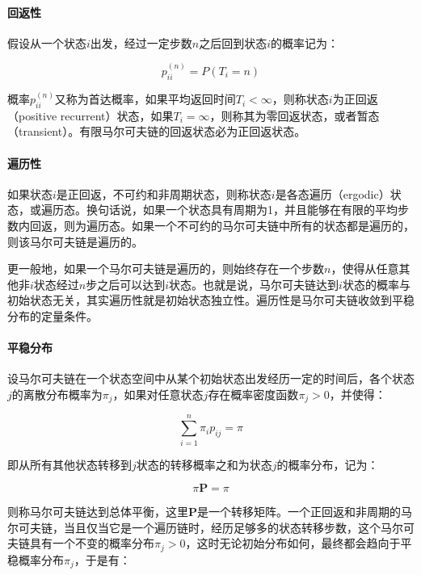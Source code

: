 \paragraph{回返性}
假设从一个状态$i$出发，经过一定步数$n$之后回到状态$i$的概率记为：

\begin{equation}
	p^{(n)}_{ii}=P(T_i=n)
\end{equation}

\noindent 概率$p^{(n)}_{ii}$又称为首达概率，如果平均返回时间$T_i<\infty$，则称状态$i$为正回返（positive recurrent）状态，如果$T_i=\infty$，则称其为零回返状态，或者暂态（transient）。有限马尔可夫链的回返状态必为正回返状态。




\paragraph{遍历性}
如果状态$i$是正回返，不可约和非周期状态，则称状态$i$是各态遍历（ergodic）状态，或遍历态。换句话说，如果一个状态具有周期为1，并且能够在有限的平均步数内回返，则为遍历态。如果一个不可约的马尔可夫链中所有的状态都是遍历的，则该马尔可夫链是遍历的。

更一般地，如果一个马尔可夫链是遍历的，则始终存在一个步数$n$，使得从任意其他非$i$状态经过$n$步之后可以达到$i$状态。也就是说，马尔可夫链达到$i$状态的概率与初始状态无关，其实遍历性就是初始状态独立性。遍历性是马尔可夫链收敛到平稳分布的定量条件。




\paragraph{平稳分布}
设马尔可夫链在一个状态空间中从某个初始状态出发经历一定的时间后，各个状态$j$的离散分布概率为$\pi_{j}$，如果对任意状态$j$存在概率密度函数$\pi_j>0$，并使得：

\begin{equation}
	\sum^{n}_{i=1}\pi_i p_{ij}=\pi
\end{equation}

\noindent 即从所有其他状态转移到$j$状态的转移概率之和为状态$j$的概率分布，记为：

\begin{equation}
	\pi \mathbf{P}=\pi
\end{equation}

\noindent 则称马尔可夫链达到总体平衡，这里$\mathbf{P}$是一个转移矩阵。一个正回返和非周期的马尔可夫链，当且仅当它是一个遍历链时，经历足够多的状态转移步数，这个马尔可夫链具有一个不变的概率分布$\pi_j>0$，这时无论初始分布如何，最终都会趋向于平稳概率分布$\pi_j$，于是有：

